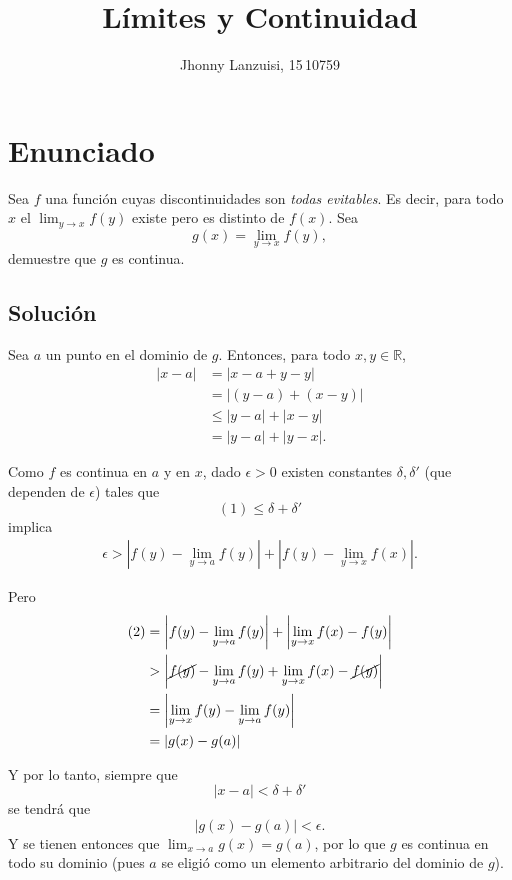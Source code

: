 \documentclass[fleqn,leqno,bigmar,draft]{tareas}
\title{Límites y Continuidad}
\author{Jhonny Lanzuisi, 15\,10759}
\begin{document}
\maketitle
{}

\section[Enunciado]{Enunciado\footnotemark}
Sea $f$ una función cuyas discontinuidades son \emph{todas evitables}. Es decir,
para todo $x$ el $ \lim_{y\to x}f(y) $ existe pero es distinto de $f(x)$. 
Sea
\[
	g(x) = \lim_{y\to x} f(y),
\]
demuestre que $g$ es continua.

\subsection{Solución}
Sea $a$ un punto en el dominio de $g$. Entonces, para todo $x,y\in\mathbb{R}$,
\begin{align*}
	\left\lvert x-a \right\rvert &= \left\lvert x-a+y-y \right\rvert\\
				     &= \left\lvert (y-a) + (x-y) \right\rvert\\
				     &\leq \left\lvert y-a \right\rvert + \left\lvert x-y \right\rvert\\
				     &= \left\lvert y-a \right\rvert + \left\lvert y-x \right\rvert.\tag{1}
\end{align*}

Como $f$ es continua en $a$ y en $x$, dado $\epsilon>0$ existen constantes
$\delta,\delta'$ (que dependen de $\epsilon$) tales que
\[
	(1)\leq\delta+\delta'
\]
implica
\begin{align*}
	\epsilon>\left\lvert f(y)- \lim_{y\to a} f(y) \right\rvert + \left\lvert f(y)- \lim_{y\to x} f(x) \right\rvert.\tag{2}
\end{align*}

Pero 
\begin{align*}
	(2)&=\left\lvert f(y)- \lim_{y\to a} f(y) \right\rvert + \left\lvert \lim_{y\to x} f(x) - f(y)\right\rvert\\
	   &>\left\lvert \cancel{f(y)}- \lim_{y\to a} f(y) + \lim_{y\to x} f(x) - \cancel{f(y)}\right\rvert\\
	   &= \left\lvert  \lim_{y\to x} f(y) - \lim_{y\to a} f(y)\right\rvert\\
	   &= \left\lvert g(x)-g(a) \right\rvert
\end{align*}

Y por lo tanto, siempre que
\[
	\left\lvert x-a \right\rvert<\delta+\delta'
\]
se tendrá que
\[
	\left\lvert g(x)-g(a) \right\rvert < \epsilon.
\]
Y se tienen entonces que $ \lim_{x\to a} g(x) = g(a)$, por lo que $g$ es continua en todo su dominio (pues $a$ se eligió como un elemento arbitrario del dominio de $g$).
\printbibliography[
heading=bibintoc,
title={Referencias}
]
\end{document}
